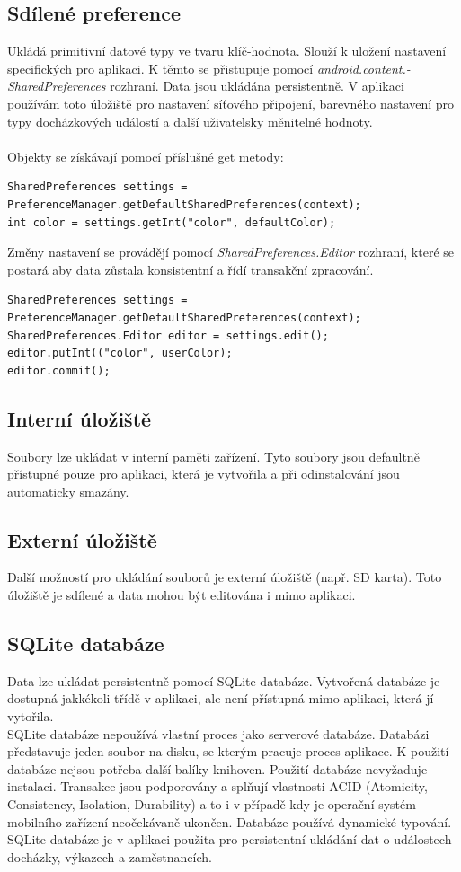 \documentclass{diplomka}
\begin{document}
\subsection*{Sdílené preference} Ukládá primitivní datové typy ve tvaru klíč-hodnota. Slouží k uložení nastavení specifických pro aplikaci. K těmto se přistupuje pomocí \emph{android.content.-\\SharedPreferences} rozhraní. Data jsou ukládána persistentně. V aplikaci používám toto úložiště pro nastavení síťového připojení, barevného nastavení pro typy docházkových událostí a další uživatelsky měnitelné hodnoty.\\ \\
Objekty se získávají pomocí příslušné get metody:
\begin{lstlisting}
SharedPreferences settings = PreferenceManager.getDefaultSharedPreferences(context);
int color = settings.getInt("color", defaultColor);
\end{lstlisting}

\noindent
Změny nastavení se provádějí pomocí \emph{SharedPreferences.Editor} rozhraní, které se postará aby data zůstala konsistentní a řídí transakční zpracování.\\
\begin{lstlisting}
SharedPreferences settings = PreferenceManager.getDefaultSharedPreferences(context);
SharedPreferences.Editor editor = settings.edit();
editor.putInt(("color", userColor);
editor.commit();
\end{lstlisting}

\subsection*{Interní úložiště}
Soubory lze ukládat v interní paměti zařízení. Tyto soubory jsou defaultně přístupné pouze pro aplikaci, která je vytvořila a při odinstalování jsou automaticky smazány.
\subsection*{Externí úložiště}
Další možností pro ukládání souborů je externí úložiště (např. SD karta).  Toto úložiště je sdílené a data mohou být editována i mimo aplikaci.
\subsection*{SQLite databáze}
Data lze ukládat persistentně pomocí SQLite\cite{sqlite} databáze. Vytvořená databáze je dostupná jakkékoli třídě v aplikaci, ale není přístupná mimo aplikaci, která jí vytořila. \\ \indent
SQLite databáze nepoužívá vlastní proces jako serverové databáze. Databázi představuje jeden soubor na disku, se kterým pracuje proces aplikace. K použití databáze nejsou potřeba další balíky knihoven. Použití databáze nevyžaduje instalaci. Transakce jsou podporovány a splňují vlastnosti ACID (Atomicity, Consistency, Isolation, Durability) a to i v případě kdy je operační systém mobilního zařízení neočekávaně ukončen. Databáze používá dynamické typování. \\ \indent
SQLite databáze je v aplikaci použita pro persistentní ukládání dat o událostech docházky, výkazech a zaměstnancích.
\end{document}
